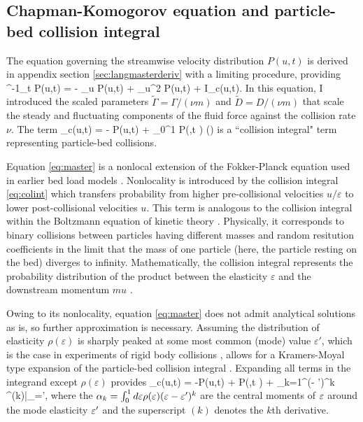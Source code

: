 \subsection{Chapman-Komogorov equation and particle-bed collision integral}

The equation governing the streamwise velocity distribution $P(u,t)$ is derived in appendix section \ref{sec:langmasterderiv} with a limiting procedure, providing
\be \nu^{-1}\partial_t P(u,t) = - \tilde{\Gamma} \partial_u P(u,t) +  \partial_u^2 P(u,t) + I_c(u,t). \label{eq:master} \ee
In this equation, I introduced the scaled parameters $\tilde{\Gamma} = \Gamma/(\nu m)$ and $\tilde{D} = D/(\nu m)$ that scale the steady and fluctuating components of the fluid force against the collision rate $\nu$. The term
\be {}_c(u,t) = - P(u,t) + \int_0^1 P\big(,t \big) \rho(\ve) \label{eq:colint} \ee
is a ``collision integral" term representing particle-bed collisions.

Equation \ref{eq:master} is a nonlocal extension of the Fokker-Planck equation used in earlier bed load models \citep{Fan2014,Ancey2014}. 
Nonlocality is introduced by the collision integral \ref{eq:colint} which transfers probability from higher pre-collisional velocities $u/\varepsilon$ to lower post-collisional velocities $u$.
This term is analogous to the collision integral within the Boltzmann equation of kinetic theory \citep{Duderstadt1979, Brilliantov2004}. Physically, it corresponds to binary collisions between particles having different masses and random resitution coefficients \cite{Serero2015} in the limit that the mass of one particle (here, the particle resting on the bed) diverges to infinity.
Mathematically, the collision integral represents the probability distribution of the product between the elasticity $\varepsilon$ and the downstream momentum $m u$ \citep[c.f.][]{Feller1968}.


Owing to its nonlocality, equation \ref{eq:master} does not admit analytical solutions as is, so further approximation is necessary.
Assuming the distribution of elasticity $\rho(\varepsilon)$ is sharply peaked at some most common (mode) value $\varepsilon'$, which is the case in experiments of rigid body collisions \citep{Glielmo2014}, allows for a Kramers-Moyal type expansion of the particle-bed collision integral \citep{Gardiner1983}.
Expanding all terms in the integrand except $\rho(\varepsilon)$ provides
\be {}_c(u,t) = -P(u,t) + P\big(,t \big) + \sum_{k=1}^\infty {}(\ve - \ve')^k ^{(k)}\Big|_{\ve=\ve'},\label{eq:expansion}\ee
where the $\alpha_k = \int_0^1 d\varepsilon \rho(\varepsilon) (\varepsilon-\varepsilon')^k $ are the central moments of $\varepsilon$ around the mode elasticity $\varepsilon'$ and the superscript $(k)$ denotes the $k$th derivative.

